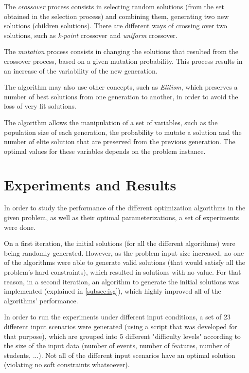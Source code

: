 \documentclass[conference]{IEEEtran}
\begin{document}
The \textit{crossover} process consists in selecting random solutions (from the set obtained in the selection process) and combining them, generating two new solutions (children solutions). There are different ways of crossing over two solutions, such as \textit{k-point} crossover and \textit{uniform} crossover.

The \textit{mutation} process consists in changing the solutions that resulted from the crossover process, based on a given mutation probability. This process results in an increase of the variability of the new generation.

The algorithm may also use other concepts, such as \textit{Elitism}, which preserves a number of best solutions from one generation to another, in order to avoid the loss of very fit solutions.

The algorithm allows the manipulation of a set of variables, such as the population size of each generation, the probability to mutate a solution and the number of elite solution that are preserved from the previous generation. The optimal values for these variables depends on the problem instance.

\section{Experiments and Results} \label{sec:ear}

In order to study the performance of the different optimization algorithms in the given problem, as well as their optimal parameterizations, a set of experiments were done.

On a first iteration, the initial solutions (for all the different algorithms) were being randomly generated. However, as the problem input size increased, no one of the algorithms were able to generate valid solutions (that would satisfy all the problem's hard constraints), which resulted in solutions with no value. For that reason, in a second iteration, an algorithm to generate the initial solutions was implemented (explained in \autoref{subsec:isg}), which highly improved all of the algorithms' performance.

In order to run the experiments under different input conditions, a set of 23 different input scenarios were generated (using a script that was developed for that purpose), which are grouped into 5 different "difficulty levels" according to the size of the input data (number of events, number of features, number of students, ...). Not all of the different input scenarios have an optimal solution (violating no soft constraints whatsoever).
\end{document}
